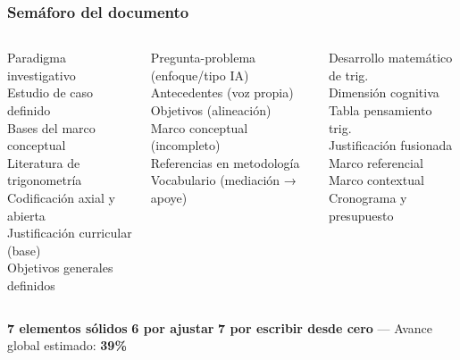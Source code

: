 \documentclass[11pt, aspectratio=169, spanish]{beamer}
\newcommand{\semOK}{\textcolor{VerdeOk}{\faCheckCircle}}
\newcommand{\semWA}{\textcolor{AmarilloAv}{\faExclamationCircle}}
\newcommand{\semNO}{\textcolor{RojoAlerta}{\faTimesCircle}}
\begin{document}
\begin{frame}[plain, shrink=22]
\frametitle{\faTrafficLight\quad Semáforo del documento}
\vspace{0pt}

\begin{columns}[T]
\begin{tcolorbox}[colback=VerdeOk!8, colframe=VerdeOk!55, arc=2mm,
  title={\footnotesize\textbf{\semOK\; Listo / sólido}}]
{\scriptsize
\semOK\; Paradigma investigativo\\[2pt]
\semOK\; Estudio de caso definido\\[2pt]
\semOK\; Bases del marco conceptual\\[2pt]
\semOK\; Literatura de trigonometría\\[2pt]
\semOK\; Codificación axial y abierta\\[2pt]
\semOK\; Justificación curricular (base)\\[2pt]
\semOK\; Objetivos generales definidos}
\end{tcolorbox}

\begin{tcolorbox}[colback=AmarilloAv!8, colframe=AmarilloAv!55, arc=2mm,
  title={\footnotesize\textbf{\semWA\; Revisar / ajustar}}]
{\scriptsize
\semWA\; Pregunta-problema (enfoque/tipo IA)\\[2pt]
\semWA\; Antecedentes (voz propia)\\[2pt]
\semWA\; Objetivos (alineación)\\[2pt]
\semWA\; Marco conceptual (incompleto)\\[2pt]
\semWA\; Referencias en metodología\\[2pt]
\semWA\; Vocabulario (mediación → apoye)}
\end{tcolorbox}

\begin{tcolorbox}[colback=RojoAlerta!7, colframe=RojoAlerta!50, arc=2mm,
  title={\footnotesize\textbf{\semNO\; Por escribir}}]
{\scriptsize
\semNO\; Desarrollo matemático de trig.\\[2pt]
\semNO\; Dimensión cognitiva\\[2pt]
\semNO\; Tabla pensamiento trig.\\[2pt]
\semNO\; Justificación fusionada\\[2pt]
\semNO\; Marco referencial\\[2pt]
\semNO\; Marco contextual\\[2pt]
\semNO\; Cronograma y presupuesto}
\end{tcolorbox}
\end{columns}

\vspace{0.06cm}

\begin{tcolorbox}[colback=GrisFondo, colframe=GrisClaro, arc=2mm]
{\footnotesize\centering
\semOK\; \textbf{7 elementos sólidos} \quad
\semWA\; \textbf{6 por ajustar} \quad
\semNO\; \textbf{7 por escribir desde cero}\quad
— Avance global estimado: \textbf{\textcolor{VerdeUNAL}{39\%}}}
\end{tcolorbox}
\end{frame}
\end{document}

